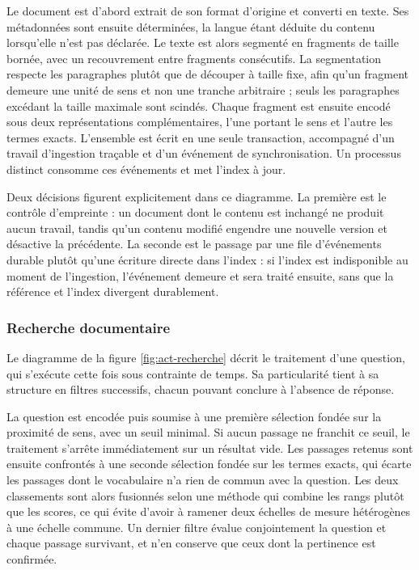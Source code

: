 Le document est d'abord extrait de son format d'origine et converti en texte. Ses métadonnées sont ensuite déterminées, la langue étant déduite du contenu lorsqu'elle n'est pas déclarée. Le texte est alors segmenté en fragments de taille bornée, avec un recouvrement entre fragments consécutifs. La segmentation respecte les paragraphes plutôt que de découper à taille fixe, afin qu'un fragment demeure une unité de sens et non une tranche arbitraire ; seuls les paragraphes excédant la taille maximale sont scindés. Chaque fragment est ensuite encodé sous deux représentations complémentaires, l'une portant le sens et l'autre les termes exacts. L'ensemble est écrit en une seule transaction, accompagné d'un travail d'ingestion traçable et d'un événement de synchronisation. Un processus distinct consomme ces événements et met l'index à jour.

Deux décisions figurent explicitement dans ce diagramme. La première est le contrôle d'empreinte : un document dont le contenu est inchangé ne produit aucun travail, tandis qu'un contenu modifié engendre une nouvelle version et désactive la précédente. La seconde est le passage par une file d'événements durable plutôt qu'une écriture directe dans l'index : si l'index est indisponible au moment de l'ingestion, l'événement demeure et sera traité ensuite, sans que la référence et l'index divergent durablement.


\subsubsection{Recherche documentaire}

Le diagramme de la figure \ref{fig:act-recherche} décrit le traitement d'une question, qui s'exécute cette fois sous contrainte de temps. Sa particularité tient à sa structure en filtres successifs, chacun pouvant conclure à l'absence de réponse.

La question est encodée puis soumise à une première sélection fondée sur la proximité de sens, avec un seuil minimal. Si aucun passage ne franchit ce seuil, le traitement s'arrête immédiatement sur un résultat vide. Les passages retenus sont ensuite confrontés à une seconde sélection fondée sur les termes exacts, qui écarte les passages dont le vocabulaire n'a rien de commun avec la question. Les deux classements sont alors fusionnés selon une méthode qui combine les rangs plutôt que les scores, ce qui évite d'avoir à ramener deux échelles de mesure hétérogènes à une échelle commune. Un dernier filtre évalue conjointement la question et chaque passage survivant, et n'en conserve que ceux dont la pertinence est confirmée.

